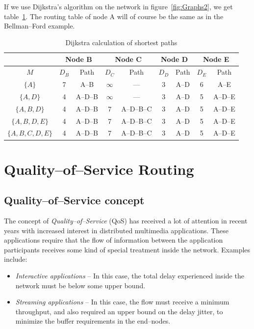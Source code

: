 \documentclass[a4paper]{article}
\begin{document}
\noindent{}If we use Dijkstra's algorithm on the network in
figure~\ref{fig:Graphs2}, we get table~\ref{tbl:dijkstra}. The
routing table of node A will of course be the same as in the
Bellman--Ford example.

\begin{table}[ht]
\centering\begin{tabular}{|c|c|c|c|c|c|c|c|c|}\hline
 & \multicolumn{2}{|c|}{Node B} & \multicolumn{2}{|c|}{Node C} & \multicolumn{2}{|c|}{Node D} & \multicolumn{2}{|c|}{Node E}
 \\ \hline
$M$ & $D_B$ & Path & $D_C$ & Path & $D_D$ & Path & $D_E$ & Path \\
\hline
%
$\{A\}$ & 7 & A--B & $\infty$ & --- & 3 & A--D & 6 & A--E \\
\hline
%
$\{A, D\}$ & 4 & A--D--B & $\infty$ & --- & 3 & A--D & 5 & A--D--E
\\ \hline
%
$\{A, B, D\}$ & 4 & A--D--B & 7 & A--D--B--C & 3 & A--D & 5 &
A--D--E \\ \hline
%
$\{A, B, D, E\}$ & 4 & A--D--B & 7 & A--D--B--C & 3 & A--D & 5 &
A--D--E \\ \hline
%
$\{A, B, C, D, E\}$ & 4 & A--D--B & 7 & A--D--B--C & 3 & A--D & 5
& A--D--E \\ \hline
%
\end{tabular}
\caption{\label{tbl:dijkstra}Dijkstra calculation of shortest
paths}
\end{table}

\section{\label{sec:QoSR}Quality--of--Service Routing}

\subsection{Quality--of--Service concept}
The concept of \emph{Quality--of--Service} (QoS) has received a
lot of attention in recent years with increased interest in
distributed multimedia applications. These applications require
that the flow of information between the application participants
receives some kind of special treatment inside the network.
Examples include:
\begin{itemize}
%
\item \emph{Interactive applications} -- In this case, the total
delay experienced inside the network must be below some upper
bound.
%
\item \emph{Streaming applications} -- In this case, the flow must
receive a minimum throughput, and also required an upper bound on
the delay jitter, to minimize the buffer requirements in the
end--nodes.
%
\end{itemize}
\end{document}
